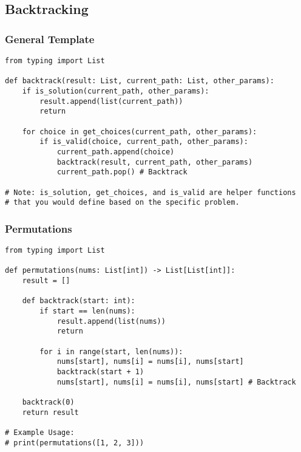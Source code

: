 \documentclass[11pt, a4paper]{article}
\begin{document}
\subsection{Backtracking}
\subsubsection{General Template}
\begin{verbatim}
from typing import List

def backtrack(result: List, current_path: List, other_params):
    if is_solution(current_path, other_params):
        result.append(list(current_path))
        return

    for choice in get_choices(current_path, other_params):
        if is_valid(choice, current_path, other_params):
            current_path.append(choice)
            backtrack(result, current_path, other_params)
            current_path.pop() # Backtrack

# Note: is_solution, get_choices, and is_valid are helper functions
# that you would define based on the specific problem.
\end{verbatim}

\subsubsection{Permutations}
\begin{verbatim}
from typing import List

def permutations(nums: List[int]) -> List[List[int]]:
    result = []
    
    def backtrack(start: int):
        if start == len(nums):
            result.append(list(nums))
            return
            
        for i in range(start, len(nums)):
            nums[start], nums[i] = nums[i], nums[start]
            backtrack(start + 1)
            nums[start], nums[i] = nums[i], nums[start] # Backtrack
            
    backtrack(0)
    return result

# Example Usage:
# print(permutations([1, 2, 3]))
\end{verbatim}
\end{document}
